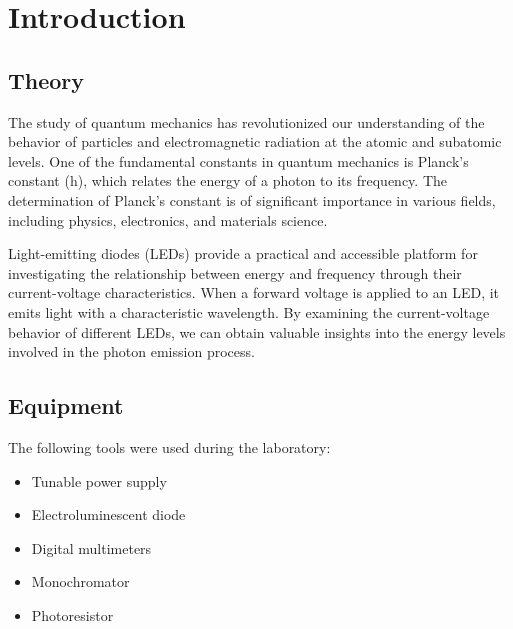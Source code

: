 \section{Introduction}

\subsection{Theory}
The study of quantum mechanics has revolutionized our understanding of the behavior of particles and electromagnetic radiation at the atomic and subatomic levels. One of the fundamental constants in quantum mechanics is Planck's constant (h), which relates the energy of a photon to its frequency. The determination of Planck's constant is of significant importance in various fields, including physics, electronics, and materials science.

Light-emitting diodes (LEDs) provide a practical and accessible platform for investigating the relationship between energy and frequency through their current-voltage characteristics. When a forward voltage is applied to an LED, it emits light with a characteristic wavelength. By examining the current-voltage behavior of different LEDs, we can obtain valuable insights into the energy levels involved in the photon emission process.
\subsection{Equipment}

The following tools were used during the laboratory:

\begin{itemize}
\item Tunable power supply 
\item Electroluminescent diode
\item Digital multimeters
\item Monochromator
\item Photoresistor
\end{itemize}

